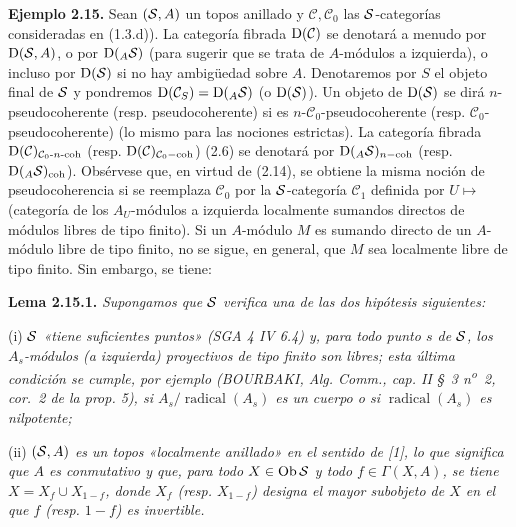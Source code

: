 \textbf{Ejemplo 2.15.} Sean \((\sisi{S}{\mathcal S},A)\) un topos anillado y \(\mathcal C,\mathcal C_0\) las \(\sisi{S}{\mathcal S}\)-categorías consideradas en (1.3.d)). La categoría fibrada \(\Dpx(\mathcal C)\) se denotará a menudo por \(\Dpx(\sisi{S}{\mathcal S},A)\), o por \(\Dpx({}_A \sisi{S}{\mathcal S})\) (para sugerir que se trata de \(A\)-módulos a izquierda), o incluso por \(\Dpx(\sisi{S}{\mathcal S})\) si no hay ambigüedad sobre \(A\). Denotaremos por \(S\) el objeto final de \(\sisi{S}{\mathcal S}\) y pondremos \(\Dpx(\mathcal C_S)=\Dpx({}_A \sisi{S}{\mathcal S})\) (o \(\Dpx(\sisi{S}{\mathcal S})\)). Un objeto de \(\Dpx(\sisi{S}{\mathcal S})\) se dirá \(n\)-pseudocoherente (resp. pseudocoherente) si es \(n\)-\(\mathcal C_0\)-pseudocoherente (resp. \(\mathcal C_0\)-pseudocoherente) (lo mismo para las nociones estrictas). La categoría fibrada \(\Dpx(\mathcal C)_{\sisi{n-\mathcal C_0-\coh}{\mathcal C_0\text{-}n\text{-coh}}}\) (resp. \(\Dpx(\mathcal C)_{\mathcal C_0-\coh}\)) (2.6) se denotará por \(\Dpx({}_A \sisi{S}{\mathcal S})_{n-\coh}\) (resp. \(\Dpx({}_A \sisi{S}{\mathcal S})_{\coh}\)). Obsérvese que, en virtud de (2.14), se obtiene la misma noción de pseudocoherencia si se reemplaza \(\mathcal C_0\) por la \(\sisi{S}{\mathcal S}\)-categoría \(\mathcal C_1\) definida por \(U\longmapsto\) (categoría de los \(A_U\)-módulos a izquierda localmente sumandos directos de módulos libres de tipo finito). Si un \(A\)-módulo \(M\) es sumando directo de un \(A\)-módulo libre de tipo finito, no se sigue, en general, que \(M\) sea localmente libre de tipo finito. Sin embargo, se tiene:

\textbf{Lema 2.15.1.} \emph{Supongamos que \(\sisi{S}{\mathcal S}\) verifica una de las dos hipótesis siguientes:}

(i) \emph{\(\sisi{S}{\mathcal S}\) «tiene suficientes puntos» (SGA 4 IV 6.4) y, para todo punto \(s\) de \(\sisi{S}{\mathcal S}\), los \(A_s\)-módulos (a izquierda) proyectivos de tipo finito son libres; esta última condición se cumple, por ejemplo (BOURBAKI, Alg. Comm., cap. II \S~3 n\textsuperscript{o}~2, cor.~2 de la prop. 5), si \(A_s/\operatorname{radical}(A_s)\) es un cuerpo o si \(\operatorname{radical}(A_s)\) es nilpotente;}

(ii) \emph{\((\sisi{S}{\mathcal S},A)\) es un topos «localmente anillado» en el sentido de [1], lo que significa que \(A\) es conmutativo y que, para todo \(X\in\Ob \sisi{S}{\mathcal S}\) y todo \(f\in\Gamma(X,A)\), se tiene \(X=X_f\cup X_{1-f}\), donde \(X_f\) (resp. \(X_{1-f}\)) designa el mayor subobjeto de \(X\) en el que \(f\) (resp. \(1-f\)) es invertible.}

